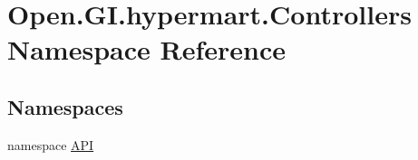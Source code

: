 \hypertarget{namespace_open_1_1_g_i_1_1hypermart_1_1_controllers}{}\section{Open.\+G\+I.\+hypermart.\+Controllers Namespace Reference}
\label{namespace_open_1_1_g_i_1_1hypermart_1_1_controllers}
\subsection*{Namespaces}
\begin{DoxyCompactItemize}
\item 
namespace \hyperlink{namespace_open_1_1_g_i_1_1hypermart_1_1_controllers_1_1_a_p_i}{A\+PI}
\end{DoxyCompactItemize}
